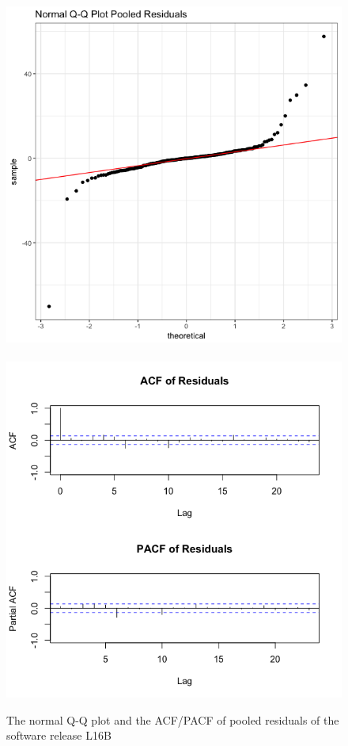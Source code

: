 \begin{figure}[H]
\begin{centering}
\includegraphics[scale=0.3]{picture/L16B_QQPool}$\quad$\includegraphics[scale=0.3]{picture/L16B_ACFPool}
\par\end{centering}
\caption{The normal Q-Q plot and the ACF/PACF of pooled residuals of the software
release L16B}
\label{L16B_plotDiag}
\end{figure}



